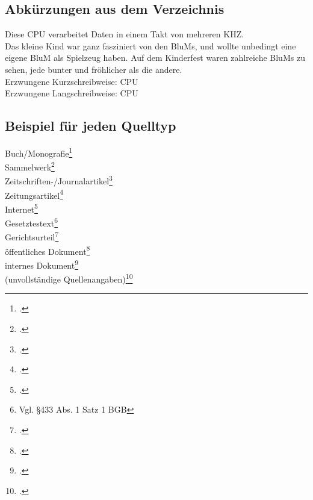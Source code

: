 \subsection{Abkürzungen aus dem Verzeichnis}

Diese \ac{CPU} verarbeitet Daten in einem Takt von mehreren \ac{KHZ}.\\
Das kleine Kind war ganz fasziniert von den \acp{BluM}, und wollte unbedingt eine eigene \ac{BluM} als Spielzeug haben. 
Auf dem Kinderfest waren zahlreiche \acp{BluM} zu sehen, jede bunter und fröhlicher als die andere.\\

Erzwungene Kurzschreibweise: \acs{CPU}\\
Erzwungene Langschreibweise: \acl{CPU}

\newpage
\subsection{Beispiel für jeden Quelltyp}%

Buch/Monografie\footcite[Vgl.][]{theisen2011}\\
Sammelwerk\footcite[Vgl.][]{maier2004}\\
Zeitschriften-/Journalartikel\footcite[Vgl.][]{chodorowreich2022loan}\\
Zeitungsartikel\footcite[Vgl.][]{dick2012neugierige}\\
Internet\footcite[Vgl.][]{capital2014}\\
Gesetztestext\footnote{Vgl. §433 Abs. 1 Satz 1 BGB}\nocite{bgb}\\
Gerichtsurteil\footcite[Vgl.][]{bverfgh1968}\\
öffentliches Dokument\footcite[Vgl.][]{eu2022access}\\
internes Dokument\footcite[Vgl.][]{abcorganigramm}\\%
(unvollständige Quellenangaben)\footcite[Vgl.][]{blankmaier}\\